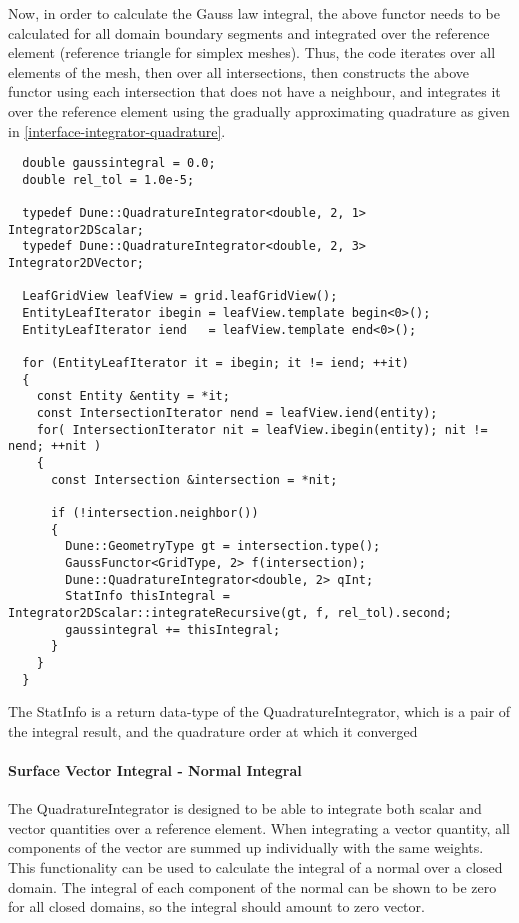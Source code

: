 \noindent
Now, in order to calculate the Gauss law integral, the above functor needs to be calculated for all domain boundary segments and integrated over the reference element (reference triangle for simplex meshes). Thus, the code iterates over all elements of the mesh, then over all intersections, then constructs the above functor using each intersection that does not have a neighbour, and integrates it over the reference element using the gradually approximating quadrature as given in \ref{interface-integrator-quadrature}. \\

\begin{mybox}
\begin{lstlisting}
  double gaussintegral = 0.0;
  double rel_tol = 1.0e-5;

  typedef Dune::QuadratureIntegrator<double, 2, 1>  Integrator2DScalar;
  typedef Dune::QuadratureIntegrator<double, 2, 3>  Integrator2DVector;

  LeafGridView leafView = grid.leafGridView();
  EntityLeafIterator ibegin = leafView.template begin<0>();
  EntityLeafIterator iend   = leafView.template end<0>();

  for (EntityLeafIterator it = ibegin; it != iend; ++it)
  {
    const Entity &entity = *it;
    const IntersectionIterator nend = leafView.iend(entity);
    for( IntersectionIterator nit = leafView.ibegin(entity); nit != nend; ++nit )
    {
      const Intersection &intersection = *nit;

      if (!intersection.neighbor())
      {
        Dune::GeometryType gt = intersection.type();
        GaussFunctor<GridType, 2> f(intersection);
        Dune::QuadratureIntegrator<double, 2> qInt;
        StatInfo thisIntegral = Integrator2DScalar::integrateRecursive(gt, f, rel_tol).second;
        gaussintegral += thisIntegral;
      }
    }
  }
\end{lstlisting}
\end{mybox}

The StatInfo is a return data-type of the QuadratureIntegrator, which is a pair of the integral result, and the quadrature order at which it converged \\


\paragraph{Surface Vector Integral - Normal Integral}
\noindent
The QuadratureIntegrator is designed to be able to integrate both scalar and vector quantities over a reference element. When integrating a vector quantity, all components of the vector are summed up individually with the same weights. This functionality can be used to calculate the integral of a normal over a closed domain. The integral of each component of the normal can be shown to be zero for all closed domains, so the integral should amount to zero vector.

